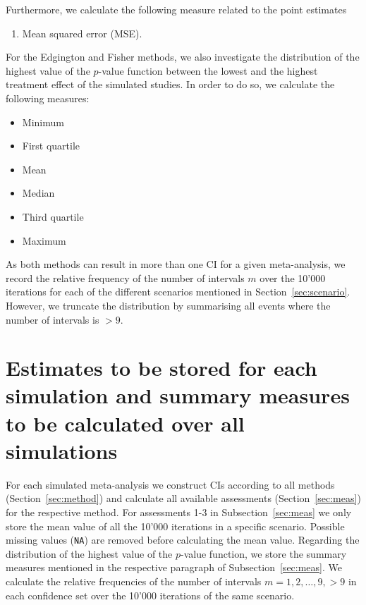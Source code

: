 \documentclass[letterpaper, 12pt]{article}
\begin{document}
Furthermore, we calculate the following measure related to the point estimates

\begin{enumerate}
  \item Mean squared error (MSE).
\end{enumerate}

\vspace*{.5cm}

For the Edgington and Fisher methods, we also investigate the
distribution of the highest value of the $p$-value function between the lowest
and the highest treatment effect of the simulated studies. In order to do so,
we calculate the following measures:

\begin{itemize}
\item Minimum
\item First quartile
\item Mean
\item Median
\item Third quartile
\item Maximum
\end{itemize}

\vspace*{.5cm}

As both methods can result in more than one CI for a given meta-analysis,
we record the relative frequency of the number of intervals $m$ over the
10'000 iterations for each of the different scenarios mentioned in
Section~\ref{sec:scenario}. However, we truncate the distribution
by summarising all events where the number of intervals is $> 9$.

\section{
  Estimates to be stored for each simulation and summary measures to
  be calculated over all simulations
}
For each simulated meta-analysis we construct CIs according to all methods
(Section~\ref{sec:method}) and calculate all available assessments
(Section~\ref{sec:meas}) for the respective method. For assessments 1-3 in
Subsection~\ref{sec:meas} we only store the mean value of all the 10'000
iterations in a specific scenario. Possible missing values (\texttt{NA}) are
removed before calculating the mean value. Regarding the distribution of the
highest value of the $p$-value function, we store the summary measures mentioned
in the respective paragraph of Subsection~\ref{sec:meas}. We calculate the
relative frequencies of the number of intervals $m=1, 2, \ldots, 9, >9$ in each
confidence set over the 10'000 iterations of the same scenario.
\end{document}
